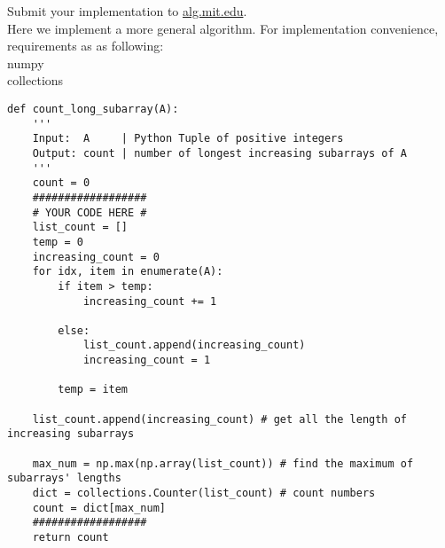 \documentclass[12pt,twoside]{article}
\begin{document}
\begin{problems}
\vfill
\problem  %
Submit your implementation to {\small\url{alg.mit.edu}}.\\
Here we implement a more general algorithm. For implementation convenience, requirements as as following: \\
numpy \\
collections \\

\begin{lstlisting}
def count_long_subarray(A):
    '''
    Input:  A     | Python Tuple of positive integers
    Output: count | number of longest increasing subarrays of A
    '''
    count = 0
    ##################
    # YOUR CODE HERE #
    list_count = []
    temp = 0
    increasing_count = 0
    for idx, item in enumerate(A):
        if item > temp:
            increasing_count += 1

        else:
            list_count.append(increasing_count)
            increasing_count = 1

        temp = item

    list_count.append(increasing_count) # get all the length of increasing subarrays

    max_num = np.max(np.array(list_count)) # find the maximum of subarrays' lengths
    dict = collections.Counter(list_count) # count numbers
    count = dict[max_num]
    ##################
    return count
\end{lstlisting}

\end{problems}
\end{document}
